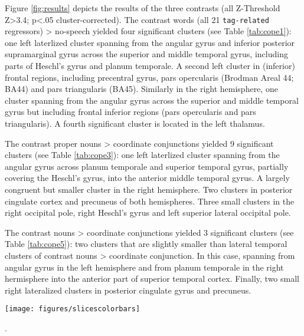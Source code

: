 \documentclass[10pt,a4paper,onecolumn]{article}
\begin{document}
Figure \ref{fig:results} depicts the results of the three contrasts (all Z-Threshold Z>3.4; p<.05 cluster-corrected).
The contrast words (all 21 \texttt{tag-related} regressors) > no-speech yielded four significant clusters (see Table \ref{tab:cope1}):
one left laterlized cluster spanning from the angular gyrus and inferior posterior supramarginal gyrus across the superior and middle temporal gyrus, including parts of Heschl's gyrus and planum temporale.
A second left cluster in (inferior) frontal regions, including precentral gyrus, pars opercularis (Brodman Areal 44; BA44) and pars triangularis (BA45).
Similarly in the right hemisphere, one cluster spanning from the angular gyrus across the superior and middle temporal gyrus but including frontal inferior regions (pars opercularis and pars triangularis).
A fourth significant cluster is located in the left thalamus.

The contrast proper nouns > coordinate conjunctions yielded 9 significant clusters (see Table \ref{tab:cope3}):
one left laterlized cluster spanning from the angular gyrus across planum temporale and superior temporal gyrus, partially covering the Heschl's gyrus, into the anterior middle temporal gyrus.
A largely congruent but smaller cluster in the right hemisphere.
Two clusters in posterior cingulate cortex and precuneus of both hemispheres.
Three small clusters in the right occipital pole, right Heschl's gyrus and left superior lateral occipital pole.

The contrast nouns > coordinate conjunctions yielded 3 significant clusters (see Table \ref{tab:cope5}):
two clusters that are slightly smaller than lateral temporal clusters of contrast nouns > coordinate conjunction. In this case, spanning from angular gyrus in the left hemisphere and from planum temporale in the right hermisphere into the anterior part of superior temporal cortex.
Finally, two small right lateralized clusters in posterior cingulate gyrus and precuneus.

\begin{figure*}
  \centering
  \texttt{[image: figures/slicescolorbars]}
  \caption{Mixed-effects group-level (N=14) GLM contrasts for the audio-description of the movie Forrest Gump. All cluster (Z>3.4, p<0.05 cluster-corrected; MNI template space)}.
\label{fig:results}
\end{figure*}
\end{document}
